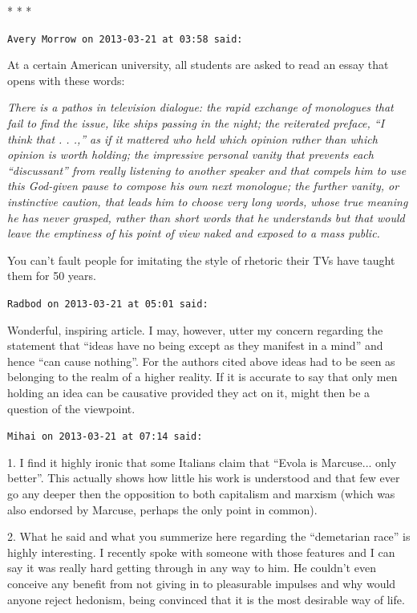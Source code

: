
\begin{center}* * *\end{center}

\begin{footnotesize}
\begin{sffamily}
\texttt{Avery Morrow on 2013-03-21 at 03:58 said:}

At a certain American university, all students are asked to read an essay that opens with these words:

\emph{There is a pathos in television dialogue: the rapid exchange of monologues that fail to find the issue, like ships passing in the night; the reiterated preface, ``I think that . . .,'' as if it mattered who held which opinion rather than which opinion is worth holding; the impressive personal vanity that prevents each ``discussant'' from really listening to another speaker and that compels him to use this God-given pause to compose his own next monologue; the further vanity, or instinctive caution, that leads him to choose very long words, whose true meaning he has never grasped, rather than short words that he understands but that would leave the emptiness of his point of view naked and exposed to a mass public.}

You can't fault people for imitating the style of rhetoric their TVs have taught them for 50 years.

\hfill

\texttt{Radbod on 2013-03-21 at 05:01 said:}

Wonderful, inspiring article. I may, however, utter my concern regarding the statement that ``ideas have no being except as they manifest in a mind'' and hence ``can cause nothing''. For the authors cited above ideas had to be seen as belonging to the realm of a higher reality. If it is accurate to say that only men holding an idea can be causative provided they act on it, might then be a question of the viewpoint.

\hfill

\texttt{Mihai on 2013-03-21 at 07:14 said:}

1. I find it highly ironic that some Italians claim that ``Evola is Marcuse... only better''. This actually shows how little his work is understood and that few ever go any deeper then the opposition to both capitalism and marxism (which was also endorsed by Marcuse, perhaps the only point in common).

2. What he said and what you summerize here regarding the ``demetarian race'' is highly interesting. I recently spoke with someone with those features and I can say it was really hard getting through in any way to him. He couldn't even conceive any benefit from not giving in to pleasurable impulses and why would anyone reject hedonism, being convinced that it is the most desirable way of life.


\end{sffamily}
\end{footnotesize}
